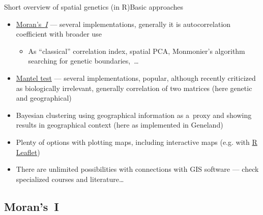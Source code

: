 \documentclass[compress, xelatex, 11pt, xcolor=svgnames, aspectratio=169,
	hyperref={
		bookmarks=true,
		unicode=true,
		colorlinks=true,
		pdftitle={Molecular data in R},
		plainpages=false,
		pdfauthor={Vojtech Zeisek},
		pdfsubject={Course about phylogeny and evolution in R},
		pdfcreator={XeLaTeX},
		pdfkeywords={R, evolution, phylogeny, molecular data},
		linkcolor=Crimson, %
		anchorcolor=Magenta, %
		citecolor=Magenta, %
		filecolor=Magenta, %
		menucolor=Magenta, %
		urlcolor=DodgerBlue, %
		},
	url={hyphens, lowtilde} %
	]{beamer}
\begin{document}
\begin{frame}{Short overview of spatial genetics (in R)}{Basic approaches}
	\begin{itemize}
		\item \href{https://en.wikipedia.org/wiki/Moran\%27s_I}{Moran's~\textit{I}} --- several implementations, generally it is autocorrelation coefficient with broader use
		\begin{itemize}
		 \item As \enquote{classical} correlation index, spatial PCA, Monmonier's algorithm searching for genetic boundaries,~\ldots
		\end{itemize}
		\item \href{https://en.wikipedia.org/wiki/Mantel_test}{Mantel test} --- several implementations, popular, although recently criticized as biologically irrelevant, generally correlation of two matrices (here genetic and geographical)
		\item Bayesian clustering using geographical information as a~proxy and showing results in geographical context (here as implemented in Geneland)
		\item Plenty of options with plotting maps, including interactive maps (e.g. with \href{https://rstudio.github.io/leaflet/}{R Leaflet})
		\item There are unlimited possibilities with connections with GIS software --- check specialized courses and literature\ldots
	\end{itemize}
\end{frame}

\subsection{Moran's~I}
\end{document}
